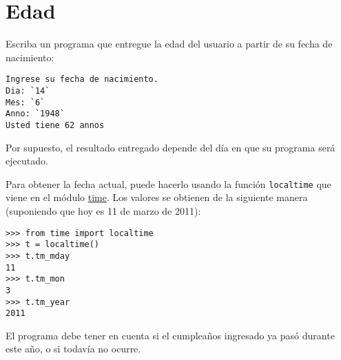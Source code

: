 \section{Edad}

Escriba un programa que entregue la edad del usuario a partir de su
fecha de nacimiento:

\begin{lstlisting}[language=testcase]
Ingrese su fecha de nacimiento.
Dia: `14`
Mes: `6`
Anno: `1948`
Usted tiene 62 annos
\end{lstlisting}

Por supuesto, el resultado entregado depende del día en que su programa
será ejecutado.

Para obtener la fecha actual, puede hacerlo usando la función
\lstinline!localtime! que viene en el módulo
\href{http://docs.python.org/library/time.html}{time}. Los valores se
obtienen de la siguiente manera (suponiendo que hoy es 11 de marzo de
2011):

\begin{lstlisting}
>>> from time import localtime
>>> t = localtime()
>>> t.tm_mday
11
>>> t.tm_mon
3
>>> t.tm_year
2011
\end{lstlisting}

El programa debe tener en cuenta si el cumpleaños ingresado ya pasó
durante este año, o si todavía no ocurre.
